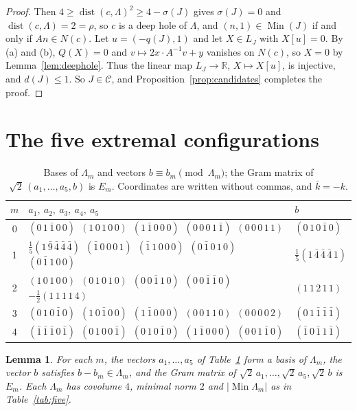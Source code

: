 \documentclass[11pt]{amsart}
\newtheorem{lemma}[theorem]{Lemma}
\theoremstyle{definition}
\theoremstyle{remark}
\numberwithin{equation}{section}
\numberwithin{table}{section}
\numberwithin{figure}{section}
\newcommand{\R}{\mathbb{R}}
\newcommand{\Min}{\operatorname{Min}}
\newcommand{\dist}{\operatorname{dist}}
\newcommand{\cand}{\mathcal{C}}
\begin{document}
\begin{proof}
Then $4\ge\dist(c,\Lambda)^2\ge4-\sigma(J)$ gives $\sigma(J)=0$ and $\dist(c,\Lambda)=2=\rho$, so $c$ is a deep hole of $\Lambda$, and $(n,1)\in\Min(J)$ if and only if $An\in N(c)$. Let $u=(-q(J),1)$ and let $X\in L_J$ with $X[u]=0$. By (a) and (b), $Q(X)=0$ and $v\mapsto2x\cdot A^{-1}v+y$ vanishes on $N(c)$, so $X=0$ by Lemma~\ref{lem:deephole}. Thus the linear map $L_J\to\R$, $X\mapsto X[u]$, is injective, and $d(J)\le1$. So $J\in\cand$, and Proposition~\ref{prop:candidates} completes the proof.
\end{proof}

\section{The five extremal configurations}\label{sec:five}

\begin{table}[t]
\centering
\small
\renewcommand{\arraystretch}{1.25}
\begin{tabular}{@{}c l l@{}}
\toprule
$m$ & $a_1,\ a_2,\ a_3,\ a_4,\ a_5$ & $b$\\
\midrule
0 & $(0\,1\,\bar{1}\,0\,0)$\ $(1\,0\,1\,0\,0)$\ $(1\,\bar{1}\,0\,0\,0)$\ $(0\,0\,0\,1\,\bar{1})$\ $(0\,0\,0\,1\,1)$ & $(0\,1\,0\,\bar{1}\,0)$ \\
1 & $\tfrac1{5}(1\,\bar{9}\,\bar{4}\,\bar{4}\,\bar{4})$\ $(\bar{1}\,0\,0\,0\,1)$\ $(\bar{1}\,1\,0\,0\,0)$\ $(0\,\bar{1}\,0\,1\,0)$\ $(0\,\bar{1}\,1\,0\,0)$ & $\tfrac1{5}(1\,\bar{4}\,\bar{4}\,\bar{4}\,1)$ \\
2 & $(1\,0\,1\,0\,0)$\ $(0\,1\,0\,1\,0)$\ $(0\,0\,\bar{1}\,1\,0)$\ $(0\,0\,\bar{1}\,\bar{1}\,0)$\ $-\tfrac1{2}(1\,1\,1\,1\,4)$ & $(1\,1\,2\,1\,1)$ \\
3 & $(0\,1\,0\,\bar{1}\,0)$\ $(1\,0\,\bar{1}\,0\,0)$\ $(1\,\bar{1}\,0\,0\,0)$\ $(0\,0\,1\,1\,0)$\ $(0\,0\,0\,0\,2)$ & $(0\,1\,\bar{1}\,\bar{1}\,\bar{1})$ \\
4 & $(\bar{1}\,\bar{1}\,\bar{1}\,0\,\bar{1})$\ $(0\,1\,0\,0\,\bar{1})$\ $(0\,1\,0\,\bar{1}\,0)$\ $(1\,\bar{1}\,0\,0\,0)$\ $(0\,0\,1\,\bar{1}\,0)$ & $(\bar{1}\,0\,\bar{1}\,1\,\bar{1})$ \\
\bottomrule
\end{tabular}
\caption{Bases of $\Lambda_m$ and vectors $b\equiv b_m\pmod{\Lambda_m}$; the Gram matrix of $\sqrt2\,(a_1,\dots,a_5,b)$ is $E_m$. Coordinates are written without commas, and $\bar k=-k$.}
\label{tab:vectors}
\end{table}

\begin{lemma}\label{lem:vectors}
For each $m$, the vectors $a_1,\dots,a_5$ of Table~\ref{tab:vectors} form a basis of $\Lambda_m$, the vector $b$ satisfies $b-b_m\in\Lambda_m$, and the Gram matrix of $\sqrt2\,a_1,\dots,\sqrt2\,a_5,\sqrt2\,b$ is $E_m$. Each $\Lambda_m$ has covolume $4$, minimal norm $2$ and $|\Min\Lambda_m|$ as in Table~\ref{tab:five}.
\end{lemma}
\end{document}
